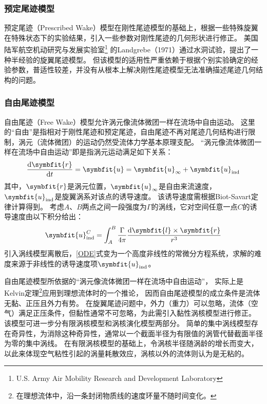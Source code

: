 \subsubsection{预定尾迹模型}
预定尾迹（Prescribed Wake）模型在刚性尾迹模型的基础上，根据一些特殊旋翼在特殊状态下的实验结果，引入一些参数对刚性尾迹的几何形状进行修正。
美国陆军航空机动研究与发展实验室\footnote{U.S. Army Air Mobility Research and Development Laboratory}
的Landgrebe（1971）通过水洞试验，提出了一种半经验的旋翼尾迹模型。
但该模型的适用性严重依赖于根据个别实验确定的经验参数，普适性较差，并没有从根本上解决刚性尾迹模型无法准确描述尾迹几何结构的问题。

\subsubsection{自由尾迹模型}
自由尾迹（Free Wake）模型允许涡元像流体微团一样在流场中自由运动。
这里的“自由”是指相对于刚性尾迹和预定尾迹，自由尾迹不再对尾迹几何结构进行限制，涡元（流体微团）的运动仍然受流体力学基本原理支配。
“涡元像流体微团一样在流场中自由运动”即是指涡元运动满足如下关系：
\begin{equation}\label{ODE}
\frac{\mathrm{d}\symbfit{r}}{\mathrm{d} t} = \symbfit{u} = \symbfit{u}_{\mathrm{\infty}}+\symbfit{u}_{\mathrm{ind}}
\end{equation}
其中，$\symbfit{r}$是涡元位置，$\symbfit{u}_{\mathrm{\infty}}$是自由来流速度，$\symbfit{u}_{\mathrm{ind}}$是旋翼涡系对该点的诱导速度。
该诱导速度需根据Biot-Savart定律计算得到。
考虑$A$、$B$两点之间一段强度为$\Gamma$的涡线，它对空间任意一点$C$的诱导速度由以下积分给出：
\begin{equation}
\symbfit{u}_{\mathrm{ind}}^{C}
=
\int_{A}^{B}
\frac{\Gamma}{4\pi}
\frac{\mathrm{d} \symbfit{l}\times\symbfit{r}}{r^3}
\end{equation}
引入涡线模型离散后，\ref{ODE}式变为一个高度非线性的常微分方程系统，求解的难度来源于非线性的诱导速度项$\symbfit{u}_{\mathrm{ind}}$。

自由尾迹模型所依据的“涡元像流体微团一样在流场中自由运动”，
实际上是Kelvin定理\footnote{在理想流体中，沿一条封闭物质线的速度环量不随时间变化。}应用到理想流体时的一个推论，
因而自由尾迹模型的成立条件是流体无黏、正压且外力有势。
在旋翼尾迹问题中，外力（重力）可以忽略，流体（空气）满足正压条件，但黏性通常不可忽略，为此需引入黏性涡核模型进行修正。
该模型可进一步分有限涡核模型和涡核演化模型两部分。
简单的集中涡线模型存在奇异性，为消除这种奇异性，通常以一个截面半径为有限值的涡管代替截面半径为零的集中涡线。
在有限涡核模型的基础上，令涡核半径随涡龄的增长而变大，以此来体现空气粘性引起的涡量耗散效应，涡核以外的流体则认为是无粘的。


